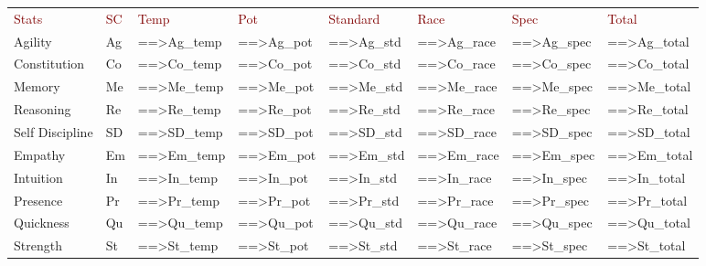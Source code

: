 \begin{tabular}{llp{1.85cm}p{1.85cm}p{1.85cm}p{1.85cm}p{1.85cm}p{1.85cm}}
  \textcolor{Maroon}{Stats} & \textcolor{Maroon}{SC} &\textcolor{Maroon}{Temp} & \textcolor{Maroon}{Pot} & \textcolor{Maroon}{Standard} & \textcolor{Maroon}{Race} & \textcolor{Maroon}{Spec} & \textcolor{Maroon}{Total}\\
  Agility & Ag & ==>Ag_temp & ==>Ag_pot & ==>Ag_std & ==>Ag_race & ==>Ag_spec & ==>Ag_total\\
  Constitution & Co &  ==>Co_temp & ==>Co_pot & ==>Co_std & ==>Co_race & ==>Co_spec & ==>Co_total\\
  Memory & Me &  ==>Me_temp & ==>Me_pot & ==>Me_std & ==>Me_race & ==>Me_spec & ==>Me_total\\
  Reasoning & Re &  ==>Re_temp & ==>Re_pot & ==>Re_std & ==>Re_race & ==>Re_spec & ==>Re_total\\
  Self Discipline & SD &  ==>SD_temp & ==>SD_pot & ==>SD_std & ==>SD_race & ==>SD_spec & ==>SD_total\\
  Empathy & Em &  ==>Em_temp & ==>Em_pot & ==>Em_std & ==>Em_race & ==>Em_spec & ==>Em_total\\
  Intuition & In &  ==>In_temp & ==>In_pot & ==>In_std & ==>In_race & ==>In_spec & ==>In_total\\
  Presence & Pr & ==>Pr_temp & ==>Pr_pot & ==>Pr_std & ==>Pr_race & ==>Pr_spec & ==>Pr_total\\
  Quickness & Qu & ==>Qu_temp & ==>Qu_pot & ==>Qu_std & ==>Qu_race & ==>Qu_spec & ==>Qu_total\\
  Strength & St &  ==>St_temp & ==>St_pot & ==>St_std & ==>St_race & ==>St_spec & ==>St_total\\
 \hline
\end{tabular}\\
\\
